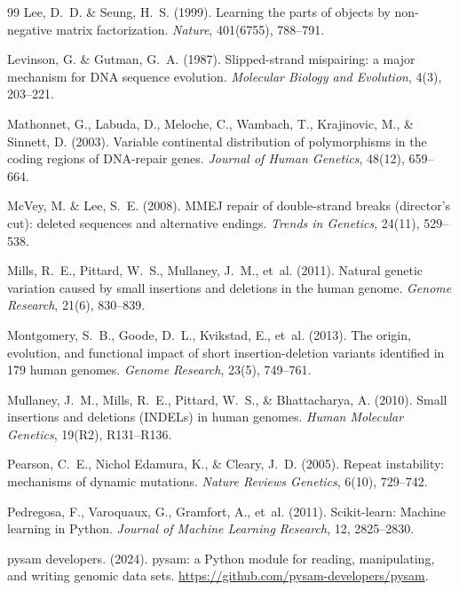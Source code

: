 \documentclass[11pt,a4paper]{article}
\begin{document}
\begin{thebibliography}{99}
Lee, D.~D. \& Seung, H.~S. (1999). Learning the parts of objects by non-negative matrix factorization. \textit{Nature}, 401(6755), 788--791.

Levinson, G. \& Gutman, G.~A. (1987). Slipped-strand mispairing: a major mechanism for DNA sequence evolution. \textit{Molecular Biology and Evolution}, 4(3), 203--221.

Mathonnet, G., Labuda, D., Meloche, C., Wambach, T., Krajinovic, M., \& Sinnett, D. (2003). Variable continental distribution of polymorphisms in the coding regions of DNA-repair genes. \textit{Journal of Human Genetics}, 48(12), 659--664.

McVey, M. \& Lee, S.~E. (2008). MMEJ repair of double-strand breaks (director's cut): deleted sequences and alternative endings. \textit{Trends in Genetics}, 24(11), 529--538.

Mills, R.~E., Pittard, W.~S., Mullaney, J.~M., et~al. (2011). Natural genetic variation caused by small insertions and deletions in the human genome. \textit{Genome Research}, 21(6), 830--839.

Montgomery, S.~B., Goode, D.~L., Kvikstad, E., et~al. (2013). The origin, evolution, and functional impact of short insertion-deletion variants identified in 179 human genomes. \textit{Genome Research}, 23(5), 749--761.

Mullaney, J.~M., Mills, R.~E., Pittard, W.~S., \& Bhattacharya, A. (2010). Small insertions and deletions (INDELs) in human genomes. \textit{Human Molecular Genetics}, 19(R2), R131--R136.

Pearson, C.~E., Nichol Edamura, K., \& Cleary, J.~D. (2005). Repeat instability: mechanisms of dynamic mutations. \textit{Nature Reviews Genetics}, 6(10), 729--742.

Pedregosa, F., Varoquaux, G., Gramfort, A., et~al. (2011). Scikit-learn: Machine learning in Python. \textit{Journal of Machine Learning Research}, 12, 2825--2830.

{pysam developers}. (2024). pysam: a Python module for reading, manipulating, and writing genomic data sets. \url{https://github.com/pysam-developers/pysam}.

\end{thebibliography}
\end{document}
